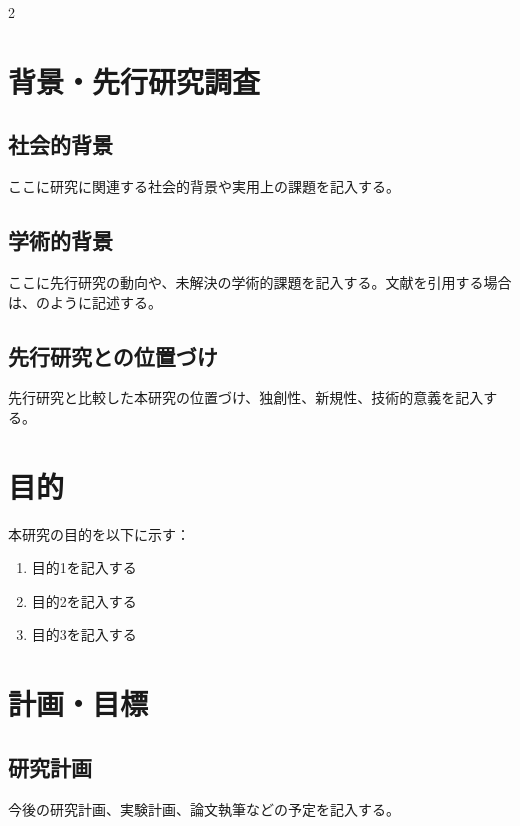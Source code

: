 \documentclass[platex,dvipdfmx,a4j,9pt]{jsarticle}
\begin{document}
\begin{multicols}{2}

\section{背景・先行研究調査}

\subsection{社会的背景}
ここに研究に関連する社会的背景や実用上の課題を記入する。

\subsection{学術的背景}
ここに先行研究の動向や、未解決の学術的課題を記入する。文献を引用する場合は、\cite{reference1}のように記述する。

\subsection{先行研究との位置づけ}
先行研究と比較した本研究の位置づけ、独創性、新規性、技術的意義を記入する。

\section{目的}
本研究の目的を以下に示す：
\begin{enumerate}
  \item 目的1を記入する
  \item 目的2を記入する
  \item 目的3を記入する
\end{enumerate}

\section{計画・目標}

\subsection{研究計画}
今後の研究計画、実験計画、論文執筆などの予定を記入する。



\end{multicols}
\end{document}
